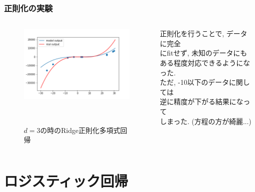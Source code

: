 \documentclass[dvipdfmx,11pt]{beamer}		%
\begin{document}
    \begin{frame}
        \frametitle{正則化の実験}
        \begin{columns}[t]
            \begin{column}{0.65\textwidth} 
                \begin{figure}
                    \centering
                    \includegraphics[width = 6.8cm]{Image/regulared.png}
                    \caption{$d = 3$の時のRidge正則化多項式回帰}
              　\end{figure}
            \end{column}
            \begin{column}{0.75\textwidth}
                正則化を行うことで, データに完全\\
                にfitせず, 未知のデータにも\\
                ある程度対応できるようになった. \\
                ただ, -10以下のデータに関しては\\
                逆に精度が下がる結果になって\\
                しまった. (方程の方が綺麗...)
            \end{column}
        \end{columns}
    \end{frame}
    \section{ロジスティック回帰}
\end{document}
